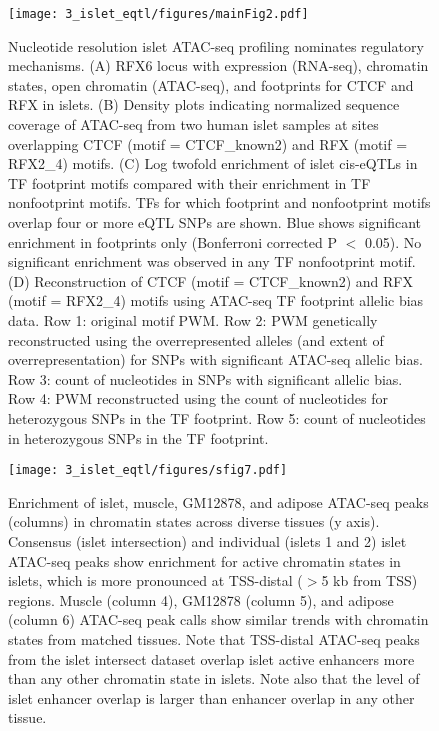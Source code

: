 \begin{figure}
    \centering
    \texttt{[image: 3\_islet\_eqtl/figures/mainFig2.pdf]}
    \caption{Nucleotide resolution islet ATAC-seq profiling nominates regulatory mechanisms. (A) RFX6 locus with expression (RNA-seq), chromatin states, open chromatin (ATAC-seq), and footprints for CTCF and RFX in islets. (B) Density plots indicating normalized sequence coverage of ATAC-seq from two human islet samples at sites overlapping CTCF (motif = CTCF\_known2) and RFX (motif = RFX2\_4) motifs. (C) Log twofold enrichment of islet cis-eQTLs in TF footprint motifs compared with their enrichment in TF nonfootprint motifs. TFs for which footprint and nonfootprint motifs overlap four or more eQTL SNPs are shown. Blue shows significant enrichment in footprints only (Bonferroni corrected P $<$ 0.05). No significant enrichment was observed in any TF nonfootprint motif. (D) Reconstruction of CTCF (motif = CTCF\_known2) and RFX (motif = RFX2\_4) motifs using ATAC-seq TF footprint allelic bias data. Row 1: original motif PWM. Row 2: PWM genetically reconstructed using the overrepresented alleles (and extent of overrepresentation) for SNPs with significant ATAC-seq allelic bias. Row 3: count of nucleotides in SNPs with significant allelic bias. Row 4: PWM reconstructed using the count of nucleotides for heterozygous SNPs in the TF footprint. Row 5: count of nucleotides in heterozygous SNPs in the TF footprint.}
    \label{fig:c2_f2}
\end{figure}

\begin{figure}
    \centering
    \texttt{[image: 3\_islet\_eqtl/figures/sfig7.pdf]}
    \caption{Enrichment of islet, muscle, GM12878, and adipose ATAC-seq peaks (columns) in chromatin states across diverse tissues (y axis). Consensus (islet intersection) and individual (islets 1 and 2) islet ATAC-seq peaks show enrichment for active chromatin states in islets, which is more pronounced at TSS-distal ($>$5 kb from TSS) regions. Muscle (column 4), GM12878 (column 5), and adipose (column 6) ATAC-seq peak calls show similar trends with chromatin states from matched tissues. Note that TSS-distal ATAC-seq peaks from the islet intersect dataset overlap islet active enhancers more than any other chromatin state in islets. Note also that the level of islet enhancer overlap is larger than enhancer overlap in any other tissue.}
    \label{fig:c2_sf7}
\end{figure}

